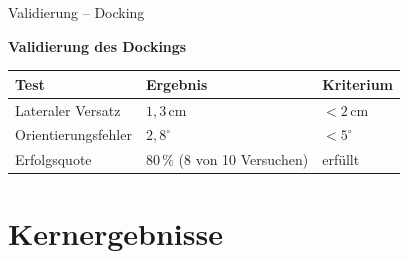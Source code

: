 \documentclass[aspectratio=169]{beamer}
\begin{document}
\begin{frame}{Validierung -- Docking}

  \textbf{Validierung des Dockings}

  \vspace{0.5em}
  {\small
  \begin{tabular}{@{}lll@{}}
    \toprule
    \textbf{Test} & \textbf{Ergebnis} & \textbf{Kriterium} \\
    \midrule
    Lateraler Versatz   & $1{,}3\,\mathrm{cm}$             & $< 2\,\mathrm{cm}$  \\
    Orientierungsfehler & $2{,}8^{\circ}$                   & $< 5^{\circ}$        \\
    Erfolgsquote        & $80\,\%$ (8 von 10 Versuchen)     & erfüllt              \\
    \bottomrule
  \end{tabular}}

\end{frame}

\section{Kernergebnisse}
\end{document}
